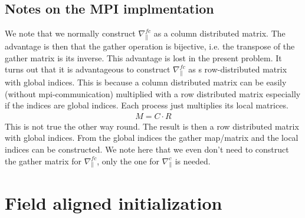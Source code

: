 \subsection{Notes on the MPI implmentation}
We note that we normally construct $\nabla_\parallel^{fc}$ as a column 
distributed
matrix. The advantage is then that the gather operation is bijective, i.e. the transpose of the gather matrix is its inverse. 
This advantage is lost in the present problem. 
It turns out that it is advantageous to construct $\nabla_\parallel^{fc}$
as s row-distributed matrix with global indices. 
This is because a column distributed matrix can be easily (without mpi-communication) multiplied
with a row distributed matrix especially if the indices are global indices. 
Each process just multiplies its local matrices.
\begin{align}
M = C\cdot R
\end{align}
This is not true the other way round. 
The result is then a row distributed matrix with global indices. 
From the global indices the gather map/matrix and the local
indices can be constructed.
We note here that we even don't need to construct the gather matrix
for $\nabla_\parallel^{fc}$, only the one for $\nabla_\parallel^c$ is
needed.
\section{Field aligned initialization} \label{sec:parallelc}

